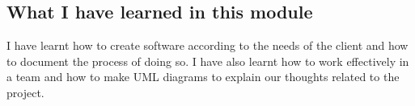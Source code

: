 

\subsection{What I have learned in this module}
I have learnt how to create software according to the needs of the client and how to document the process of doing so. 
I have also learnt how to work effectively in a team and how to make UML diagrams to explain our thoughts related to the project.

